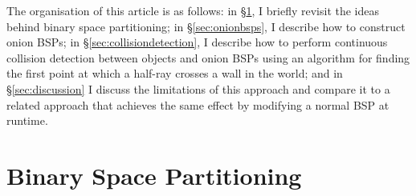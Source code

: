 \documentclass[10pt,twocolumn]{article}
\begin{document}
The organisation of this article is as follows: in \S\ref{sec:bsps}, I briefly revisit the ideas behind binary space partitioning; in \S\ref{sec:onionbsps}, I describe how to construct onion BSPs; in \S\ref{sec:collisiondetection}, I describe how to perform continuous collision detection between objects and onion BSPs using an algorithm for finding the first point at which a half-ray crosses a wall in the world; and in \S\ref{sec:discussion} I discuss the limitations of this approach and compare it to a related approach that achieves the same effect by modifying a normal BSP at runtime.

\section{Binary Space Partitioning}
\label{sec:bsps}
\end{document}
